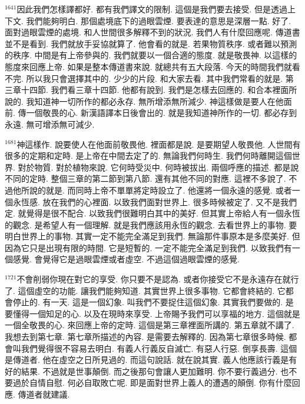 \documentclass{book}
\begin{document}
$^{1641}$因此我們怎樣譯都好.
都有我們譯文的限制.
這個是我們要去接受.
但是透過上下文.
我們能夠明白.
那個處境底下的過眼雲煙.
要表達的意思是深層一點.
好了.
面對過眼雲煙的處境.
和人世間很多解釋不到的狀況.
我們人有什麼回應呢.
傳道書並不是看到.
我們就放手妥協就算了.
他會看的就是.
若果物質秩序.
或者難以預測的秩序.
中間是有上帝參與的.
我們就要以一個合適的態度.
就是敬畏神.
以這樣的態度來回應上帝.
如果是整本傳道書來說.
就總共有五大段落.
今天的時間我們就看不完.
所以我只會選擇其中的.
少少的片段.
和大家去看.
其中我們常看的就是.
第三章十四節.
我們看三章十四節.
他都有說到.
我們是怎樣去回應的.
和合本裡面所說的.
我知道神一切所作的都必永存.
無所增添無所減少.
神這樣做是要人在他面前.
傳一個敬畏的心.
新漢語譯本日後會出的.
就是我知道神所作的一切.
都必存到永遠.
無可增添無可減少.

$^{1681}$神這樣作.
說要使人在他面前敬畏他.
裡面都是說.
是要期望人敬畏他.
人世間有很多的定期和定時.
是上帝在中間去定了的.
無論我們何時生.
我們何時離開這個世界.
對於物質.
對於植物來說.
它何時受災中.
何時被拔出.
兩個呼應的描述.
都是說不同的定時.
整個三章的第二節到第八節.
還有其他不同的對應.
這裡不多說了.
不過他所說的就是.
而同時上帝不單單將定時設立了.
他還將一個永遠的感覺.
或者一個永恆感.
放在我們的心裡面.
以致我們面對世界上.
很多時候被定了.
又不是我們定.
就覺得是很不配合.
以致我們很難明白其中的美好.
但其實上帝給人有一個永恆的觀念.
是希望人有一個理解.
就是我們應該用永恆的觀念.
去看世界上的事物.
要明白世界上的事物.
其實一定不能完全滿足到我們.
無論那件事原本是多麼美好.
但因為它只是出現有限的時間.
它是短暫的.
一定不能完全滿足到我們.
以致我們有一個感覺.
會覺得它是過眼雲煙或者虛空.
不過這個過眼雲煙的感覺.

$^{1721}$不會削弱你現在對它的享受.
你只要不是認為.
或者你接受它不是永遠存在就行了.
這個虛空的功能.
讓我們能夠知道.
其實世界上很多事物.
它都會終結的.
它都會停止的.
有一天.
這是一個幻象.
叫我們不要捉住這個幻象.
其實我們要做的.
是要懂得一個知足的心.
以及在現時來享受.
上帝賜予我們可以享福的地方.
這個就是一個全敬畏的心.
來回應上帝的定時.
這個是第三章裡面所講的.
第五章就不講了.
我想去到第七章.
第七章所描述的內容.
是需要去解釋的.
因為第七章很多時候.
都會叫我們覺得很不容易去明白.
有義人行義反自滅亡.
有惡人行惡.
倒享長壽.
這個是傳道者.
他在虛空之日所見過的.
而這句說話.
就在說其實.
義人他應該行義是有好的結果.
不過就是世事顛倒.
而之後那句會讓人更加難明.
你不要行義過分.
也不要過於自情自慰.
何必自取敗亡呢.
即是面對世界上義人的遭遇的顛倒.
你有什麼回應.
傳道者就建議.
\end{document}
